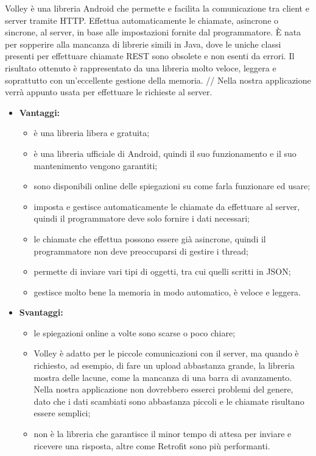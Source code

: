 	Volley è una libreria Android che permette e facilita la comunicazione tra client e server tramite HTTP. Effettua automaticamente le chiamate, asincrone o sincrone, al server, in base alle impostazioni fornite dal programmatore. È nata per sopperire alla mancanza di librerie simili in Java, dove le uniche classi presenti per effettuare chiamate REST sono obsolete e non esenti da errori. Il risultato ottenuto è rappresentato da una libreria molto veloce, leggera e soprattutto con un'eccellente gestione della memoria. //
	Nella nostra applicazione verrà appunto usata per effettuare le richieste al server.

	\begin{itemize}
		\item \textbf{Vantaggi:}
			\begin{itemize}
				\item è una libreria libera e gratuita;
				\item è una libreria ufficiale di Android, quindi il suo funzionamento e il suo mantenimento vengono garantiti;
				\item sono disponibili online delle spiegazioni su come farla funzionare ed usare;
				\item imposta e gestisce automaticamente le chiamate da effettuare al server, quindi il programmatore deve solo fornire i dati necessari;
				\item le chiamate che effettua possono essere già asincrone, quindi il programmatore non deve preoccuparsi di gestire i thread;
				\item permette di inviare vari tipi di oggetti, tra cui quelli scritti in JSON;
				\item gestisce molto bene la memoria in modo automatico, è veloce e leggera.
			\end{itemize}
		\item \textbf{Svantaggi:}
			\begin{itemize}
				\item le spiegazioni online a volte sono scarse o poco chiare;
				\item Volley è adatto per le piccole comunicazioni con il server, ma quando è richiesto, ad esempio, di fare un upload abbastanza grande, la libreria mostra delle lacune, come la mancanza di una barra di avanzamento. Nella nostra applicazione non dovrebbero esserci problemi del genere, dato che i dati scambiati sono abbastanza piccoli e le chiamate risultano essere semplici;
				\item non è la libreria che garantisce il minor tempo di attesa per inviare e ricevere una risposta, altre come Retrofit sono più performanti.
			\end{itemize}
	\end{itemize}
	
	
	
	
	